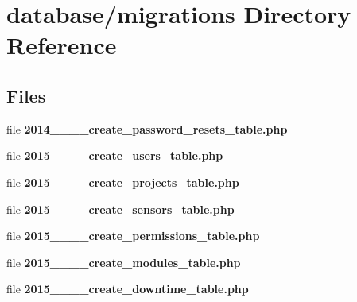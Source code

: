 \section{database/migrations Directory Reference}
\label{dir_07f515fc84215f855aa85ca0043bcdf3}
\subsection*{Files}
\begin{DoxyCompactItemize}
\item 
file {\bf 2014\+\_\+\_\+\_\+\_\+create\+\_\+password\+\_\+resets\+\_\+table.\+php}
\item 
file {\bf 2015\+\_\+\_\+\_\+\_\+create\+\_\+users\+\_\+table.\+php}
\item 
file {\bf 2015\+\_\+\_\+\_\+\_\+create\+\_\+projects\+\_\+table.\+php}
\item 
file {\bf 2015\+\_\+\_\+\_\+\_\+create\+\_\+sensors\+\_\+table.\+php}
\item 
file {\bf 2015\+\_\+\_\+\_\+\_\+create\+\_\+permissions\+\_\+table.\+php}
\item 
file {\bf 2015\+\_\+\_\+\_\+\_\+create\+\_\+modules\+\_\+table.\+php}
\item 
file {\bf 2015\+\_\+\_\+\_\+\_\+create\+\_\+downtime\+\_\+table.\+php}
\end{DoxyCompactItemize}

